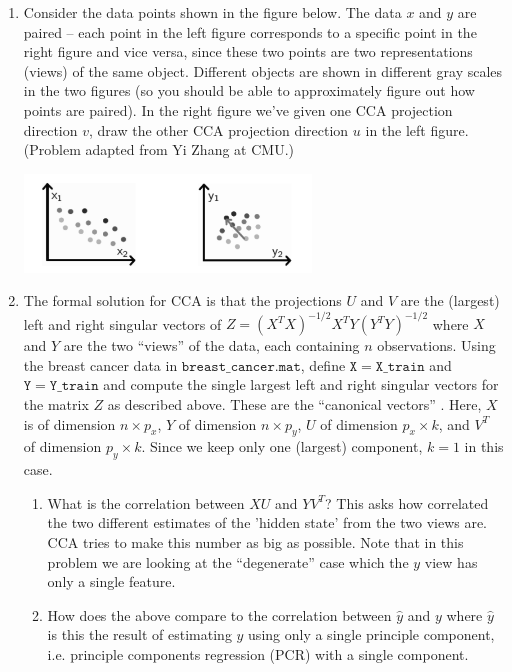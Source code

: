 \begin{enumerate}
\item {} 
Consider the data points shown in the figure below. 
The data $x$ and $y$ are paired -- each point in the left figure corresponds to a specific point in the right figure and vice versa, since these two points are two representations (views) of the same object. 
Different objects are shown in different gray scales in the two figures (so you should be
able to approximately figure out how points are paired). In the right figure we've given one CCA projection
direction $v$, draw the other CCA projection direction $u$ in the left figure. (Problem adapted from Yi Zhang at CMU.)

\includegraphics[width=0.6\textwidth]{images/cca.png}


\item {} 
The formal solution for CCA is that the projections $U$ and $V$ are the (largest) left and right singular vectors of
$Z=(X^TX)^{-1/2} X^TY (Y^TY)^{-1/2}$ where $X$ and $Y$ are the two ``views'' of the data, each containing $n$ observations. 
Using the breast cancer data in \(\mathtt{breast\_cancer.mat}\), define \(\mathtt{X=X\_train}\) and \(\mathtt{Y=Y\_train}\) and compute the single largest left and right singular vectors for the matrix \(Z\) as described above.
These are the ``canonical vectors'' .
Here, $X$ is of dimension $n \times p_x$, $Y$ of dimension $n \times p_y$,
$U$ of dimension $p_x \times k$, and $V^T$ of dimension $p_y \times k$.  Since we keep only one (largest) component, $k=1$ in this case.


\begin{enumerate}
\item What is the correlation between  $XU$ and $YV^T$? 
This asks how correlated the two different estimates of the 'hidden state' from the two views are. 
CCA tries to make this number as big as possible.
Note that in this problem  we are looking at the ``degenerate'' case which the $y$ view has only a single feature.

\item How does the above compare to the correlation between $\hat{y}$ and $y$ where 
$\hat{y}$ is this the result of estimating $y$ using only a single principle component, i.e. principle components regression (PCR) with a single component.


\end{enumerate}


\end{enumerate}
